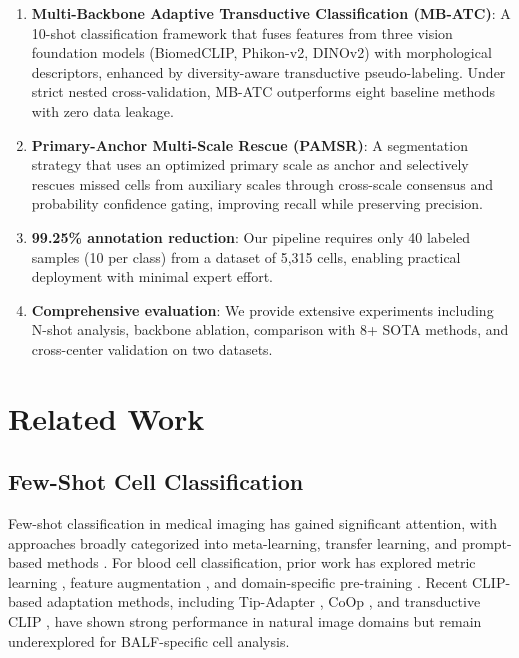 \documentclass[preprint,review,12pt]{elsarticle}
\begin{document}
\begin{enumerate}
    \item \textbf{Multi-Backbone Adaptive Transductive Classification (MB-ATC)}: A 10-shot classification framework that fuses features from three vision foundation models (BiomedCLIP, Phikon-v2, DINOv2) with morphological descriptors, enhanced by diversity-aware transductive pseudo-labeling. Under strict nested cross-validation, MB-ATC outperforms eight baseline methods with zero data leakage.
    
    \item \textbf{Primary-Anchor Multi-Scale Rescue (PAMSR)}: A segmentation strategy that uses an optimized primary scale as anchor and selectively rescues missed cells from auxiliary scales through cross-scale consensus and probability confidence gating, improving recall while preserving precision.
    
    \item \textbf{99.25\% annotation reduction}: Our pipeline requires only 40 labeled samples (10 per class) from a dataset of 5,315 cells, enabling practical deployment with minimal expert effort.
    
    \item \textbf{Comprehensive evaluation}: We provide extensive experiments including N-shot analysis, backbone ablation, comparison with 8+ SOTA methods, and cross-center validation on two datasets.
\end{enumerate}


\section{Related Work}
\label{sec:related}

\subsection{Few-Shot Cell Classification}

Few-shot classification in medical imaging has gained significant attention, with approaches broadly categorized into meta-learning, transfer learning, and prompt-based methods \cite{wang2020generalizing}. For blood cell classification, prior work has explored metric learning \cite{chen2023metric}, feature augmentation \cite{li2021few}, and domain-specific pre-training \cite{filiot2024phikon}. Recent CLIP-based adaptation methods, including Tip-Adapter \cite{zhang2022tip}, CoOp \cite{zhou2022coop}, and transductive CLIP \cite{martin2024transductive}, have shown strong performance in natural image domains but remain underexplored for BALF-specific cell analysis.
\end{document}
